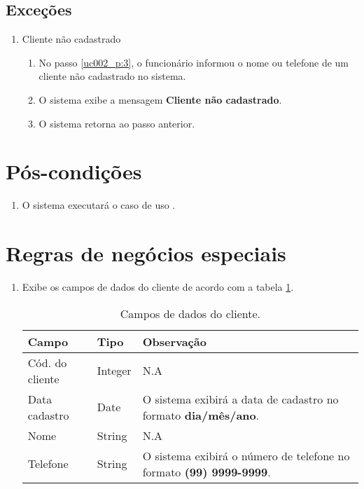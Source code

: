 \subsection{Exceções}

\begin{enumerate}[label=E\arabic*]
	\item Cliente não cadastrado \label{uc002_e:1}
	\begin{enumerate}[label*=.\arabic*]
		\item[] No passo \ref{uc002_p:3}, o funcionário informou o nome ou telefone de um cliente não cadastrado no sistema.
		\item O sistema exibe a mensagem \textbf{Cliente não cadastrado}.
		\item O sistema retorna ao passo anterior.
	\end{enumerate}
\end{enumerate}

\section{Pós-condições}

\begin{enumerate}
	\item O sistema executará o caso de uso .	
\end{enumerate}

\section{Regras de negócios especiais}

\begin{enumerate}[label=RN\arabic*]
	\item Exibe os campos de dados do cliente de acordo com a tabela \ref{uc002_tb_rn1}. \label{uc002_rn:1}
	\begin{table}[htb]
		\ABNTEXfontereduzida
		\caption[Campos de dados do cliente]{Campos de dados do cliente.}
		\label{uc002_tb_rn1}
		\begin{tabular}{|p{4.0cm}|p{3.0cm}|p{7.25cm}|}
			\hline
			\textbf{Campo}      & \textbf{Tipo} & \textbf{Observação}                                                        \\ \hline
			Cód. do cliente     & Integer       & N.A                                                                        \\ \hline
			Data cadastro       & Date          & O sistema exibirá a data de cadastro no formato \textbf{dia/mês/ano}.      \\ \hline
			Nome                & String        & N.A                                                                        \\ \hline			
			Telefone            & String        & O sistema exibirá o número de telefone no formato \textbf{(99) 9999-9999}. \\ \hline			
		\end{tabular}
	\end{table}
\end{enumerate}